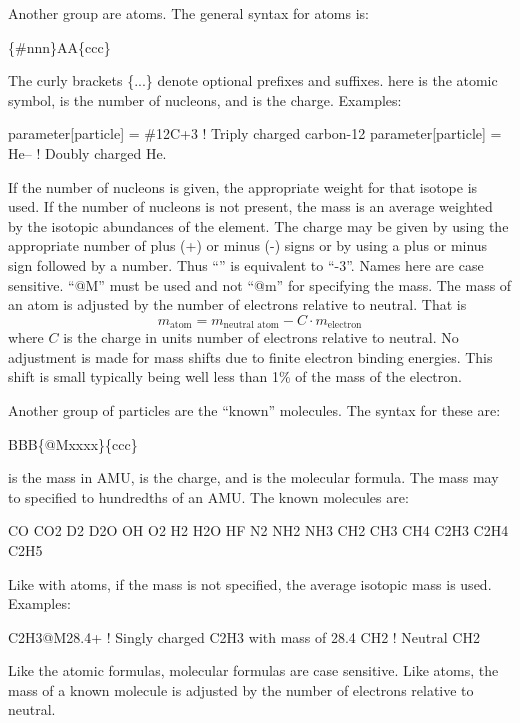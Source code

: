 {{{{{Another group are atoms. The general syntax for atoms is:
\begin{example}
  \{\#nnn\}AA\{ccc\}
\end{example}
The curly brackets \{...\} denote optional prefixes and suffixes.  here is the
atomic symbol,  is the number of nucleons, and  is the charge. Examples:
\begin{example}
  parameter[particle] = \#12C+3       ! Triply charged carbon-12
  parameter[particle] = He--          ! Doubly charged He.
\end{example}
If the number of nucleons is given, the appropriate weight for that isotope is used. If the number
of nucleons is not present, the mass is an average weighted by the isotopic abundances of the
element. The charge may be given by using the appropriate number of plus (+) or minus (-) signs or
by using a plus or minus sign followed by a number. Thus ``\vn{-{-}-}'' is equivalent to
``-3''. Names here are case sensitive. ``@M'' must be used and not ``@m'' for specifying the mass.
The mass of an atom is adjusted by the number of electrons relative to neutral. That is
\begin{equation}
  m_{\mbox{atom}} = m_{\mbox{neutral atom}} - C \cdot m_{\mbox{electron}}
\end{equation}
where $C$ is the charge in units number of electrons relative to neutral. No adjustment is made for
mass shifts due to finite electron binding energies. This shift is small typically being well less
than 1\% of the mass of the electron.

Another group of particles are the ``known'' molecules. The syntax for these are:
\begin{example}
  BBB\{@Mxxxx\}\{ccc\}
\end{example}
 is the mass in AMU,  is the charge, and  is the molecular formula. The
mass may to specified to hundredths of an AMU. The known molecules are:
\begin{example}
  CO       CO2      
  D2       D2O      
  OH       O2      
  H2       H2O      HF
  N2       NH2      NH3      
  CH2      CH3      CH4      
  C2H3     C2H4     C2H5
\end{example}
Like with atoms, if the mass is not specified, the average isotopic mass is used. Examples:
\begin{example}
  C2H3@M28.4+     ! Singly charged C2H3 with mass of 28.4
  CH2             ! Neutral CH2
\end{example}
Like the atomic formulas, molecular formulas are case sensitive. Like atoms, the mass of a known molecule
is adjusted by the number of electrons relative to neutral.

}}}}}
